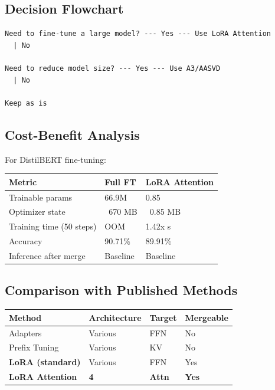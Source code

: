 \subsection{Decision Flowchart}

\begin{lstlisting}
Need to fine-tune a large model? --- Yes --- Use LoRA Attention
  | No
   
Need to reduce model size? --- Yes --- Use A3/AASVD
  | No
   
Keep as is
\end{lstlisting}

\subsection{Cost-Benefit Analysis}

For DistilBERT fine-tuning:

\begin{table}[H]
\centering
\small
\begin{tabular}{lll}
\toprule
\textbf{Metric} & \textbf{Full FT} & \textbf{LoRA Attention} \\
\midrule
Trainable params & 66.9M & 0.85 \\
Optimizer state & ~670 MB & ~0.85 MB \\
Training time (50 steps) & OOM & 1.42x s \\
Accuracy & 90.71\% & 89.91\% \\
Inference after merge & Baseline & Baseline \\
\bottomrule
\end{tabular}
\end{table}

\subsection{Comparison with Published Methods}

\begin{table}[H]
\centering
\small
\begin{tabular}{llll}
\toprule
\textbf{Method} & \textbf{Architecture} & \textbf{Target} & \textbf{Mergeable} \\
\midrule
Adapters & Various & FFN & No \\
Prefix Tuning & Various & KV & No \\
\textbf{LoRA (standard)} & Various & FFN & Yes \\
\textbf{LoRA Attention} & \textbf{4} & \textbf{Attn} & \textbf{Yes} \\
\bottomrule
\end{tabular}
\end{table}


